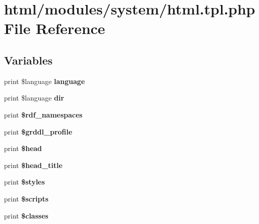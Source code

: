 \hypertarget{html_8tpl_8php}{
\section{html/modules/system/html.tpl.php File Reference}
\label{html_8tpl_8php}
}
\subsection*{Variables}
\begin{DoxyCompactItemize}
\item 
\hypertarget{html_8tpl_8php_a42cd582c44c919666b05626f0b2a39d3}{
print \$language {\bfseries language}}
\label{html_8tpl_8php_a42cd582c44c919666b05626f0b2a39d3}

\item 
\hypertarget{html_8tpl_8php_a9046a842bdd63fcdce32768992ca7e93}{
print \$language {\bfseries dir}}
\label{html_8tpl_8php_a9046a842bdd63fcdce32768992ca7e93}

\item 
\hypertarget{html_8tpl_8php_a757a2e43eabebdf258388f25852bdf8a}{
print {\bfseries \$rdf\_\-namespaces}}
\label{html_8tpl_8php_a757a2e43eabebdf258388f25852bdf8a}

\item 
\hypertarget{html_8tpl_8php_a595cfd3fb04ccef19394997205e51540}{
print {\bfseries \$grddl\_\-profile}}
\label{html_8tpl_8php_a595cfd3fb04ccef19394997205e51540}

\item 
\hypertarget{html_8tpl_8php_a2758cd2886f39b56c05b61ab6cec7a5d}{
print {\bfseries \$head}}
\label{html_8tpl_8php_a2758cd2886f39b56c05b61ab6cec7a5d}

\item 
\hypertarget{html_8tpl_8php_a107cec09f27fd63715a39ba222571e1e}{
print {\bfseries \$head\_\-title}}
\label{html_8tpl_8php_a107cec09f27fd63715a39ba222571e1e}

\item 
\hypertarget{html_8tpl_8php_a8f1db0526d0e6b99ae580d83209e717f}{
print {\bfseries \$styles}}
\label{html_8tpl_8php_a8f1db0526d0e6b99ae580d83209e717f}

\item 
\hypertarget{html_8tpl_8php_a2163fdf9fe7af884a6291084c2811896}{
print {\bfseries \$scripts}}
\label{html_8tpl_8php_a2163fdf9fe7af884a6291084c2811896}

\item 
\hypertarget{html_8tpl_8php_a6d48ecbdbc70ca1812e665169b5fa1e2}{
print {\bfseries \$classes}}
\label{html_8tpl_8php_a6d48ecbdbc70ca1812e665169b5fa1e2}


\end{DoxyCompactItemize}
